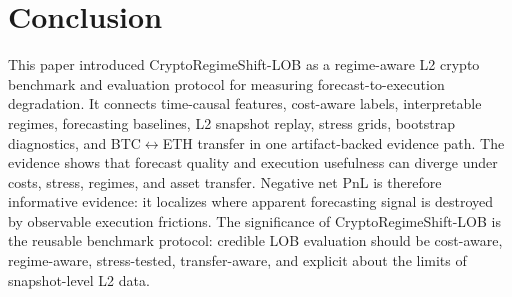 \documentclass[conference]{IEEEtran}
\begin{document}
\section{Conclusion}
This paper introduced CryptoRegimeShift-LOB as a regime-aware L2 crypto benchmark and evaluation protocol for measuring forecast-to-execution degradation. It connects time-causal features, cost-aware labels, interpretable regimes, forecasting baselines, L2 snapshot replay, stress grids, bootstrap diagnostics, and BTC$\leftrightarrow$ETH transfer in one artifact-backed evidence path. The evidence shows that forecast quality and execution usefulness can diverge under costs, stress, regimes, and asset transfer. Negative net PnL is therefore informative evidence: it localizes where apparent forecasting signal is destroyed by observable execution frictions. The significance of CryptoRegimeShift-LOB is the reusable benchmark protocol: credible LOB evaluation should be cost-aware, regime-aware, stress-tested, transfer-aware, and explicit about the limits of snapshot-level L2 data.



\end{document}
